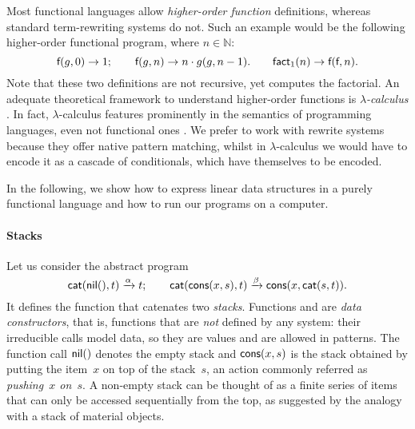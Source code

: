 Most functional languages allow \emph{higher-order
  function}
definitions, whereas standard term\hyp{}rewriting systems do not. Such
an example would be the following higher\hyp{}order functional
program, where \(n \in \mathbb{N}\):
\begin{equation*}
\textsf{f}(g,0) \rightarrow 1;
\qquad
\textsf{f}(g,n) \rightarrow n \cdot g(g,n-1).
\qquad
\textsf{fact}_1(n) \rightarrow \textsf{f}(\textsf{f},n).
\end{equation*}
Note that these two definitions are not recursive, yet
 computes the
factorial. An adequate theoretical
framework to understand higher\hyp{}order functions is
\emph{\(\lambda\)-calculus}\hspace*{-2.1pt}
\citep{HindleySeldin_2008,VanLeeuwen_1990b}.
 In fact,
\(\lambda\)-calculus features prominently in the semantics of
programming languages, even not functional ones
\citep{Winskel_1993,Reynolds_1998,Pierce_2002,FriedmanWand_2008,TurbakGifford_2008}. We
prefer to work with rewrite systems because they offer native pattern
matching, whilst in
\(\lambda\)-calculus we
would have to encode it as a cascade of conditionals, which have
themselves to be encoded.

In the following, we show how to express linear data structures in a
purely functional language and how to run our programs on a computer.

\paragraph{Stacks}
\label{par:stacks}

Let us consider the abstract program
\begin{equation*}
\textsf{cat}(\textsf{nil}(),t)     \xrightarrow{\smash{\alpha}} t;\qquad
\textsf{cat}(\textsf{cons}(x,s),t) \xrightarrow{\smash{\beta}}
                                \textsf{cons}(x,\textsf{cat}(s,t)).
\end{equation*}
It defines the function  that
catenates  two \emph{stacks}. Functions
 and  are \emph{data
  constructors}, that is,
functions that are \emph{not} defined by any system: their irreducible
calls model data, so they are values and are allowed in patterns. The
function call \(\textsf{nil}()\) denotes the empty stack and
\(\textsf{cons}(x,s)\) is the stack obtained by putting the item~\(x\) on
top of the stack~\(s\), an action commonly referred as
\textsl{pushing~\(x\) on~\(s\)}. A non\hyp{}empty stack can be thought
of as a finite series of items that can only be accessed sequentially
from the top, as suggested by the analogy with a stack of material
objects.


